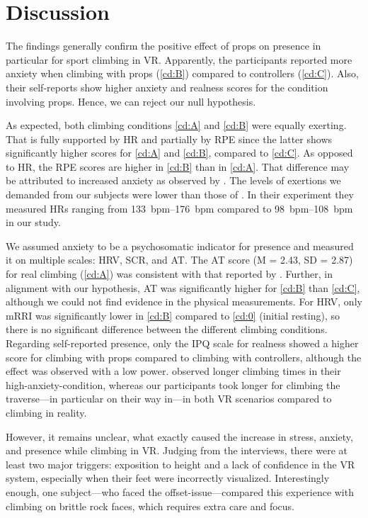 \section{Discussion}
\label{sec:discussion}

The findings generally confirm the positive effect of props on presence \autocite{Meehan2001} in particular for sport climbing in \gls{VR}. Apparently, the participants reported more anxiety when climbing with props (\ref{cd:B}) compared to controllers (\ref{cd:C}). Also, their self-reports show higher anxiety and realness scores for the condition involving props. Hence, we can reject our null hypothesis.

As expected, both climbing conditions \ref{cd:A} and \ref{cd:B} were equally exerting. That is fully supported by \gls{HR} and partially by \gls{RPE} since the latter shows significantly higher scores for \ref{cd:A} and \ref{cd:B}, compared to \ref{cd:C}. As opposed to \gls{HR}, the \gls{RPE} scores are higher in \ref{cd:B} than in \ref{cd:A}. That difference may be attributed to increased anxiety as observed by \textcite{Hardy2007}. The levels of exertions we demanded from our subjects were lower than those of \textcite{Pijpers2003}. In their experiment they measured \glspl{HR} ranging from \SIrange{133}{176}{bpm} compared to \SIrange{98}{108}{bpm} in our study. 

We assumed anxiety to be a psychosomatic indicator for presence and measured it on multiple scales: \gls{HRV}, \gls{SCR}, and \gls{AT}. The \gls{AT} score (M = 2.43, SD = 2.87) for real climbing (\ref{cd:A}) was consistent with that reported by \textcite[M = 2.7, SD = 1.9]{Pijpers2005}. Further, in alignment with our hypothesis, \gls{AT} was significantly higher for \ref{cd:B} than \ref{cd:C}, although we could not find evidence in the physical measurements. For \gls{HRV}, only \gls{mRRI} was significantly lower in \ref{cd:B} compared to \ref{cd:0} (initial resting), so there is no significant difference between the different climbing conditions. Regarding self-reported presence, only the \gls{IPQ} scale for realness showed a higher score for climbing with props compared to climbing with controllers, although the effect was observed with a low power. \textcite{Pijpers2005} observed longer climbing times in their high-anxiety-condition, whereas our participants took longer for climbing the traverse---in particular on their way in---in both \gls{VR} scenarios compared to climbing in reality.

However, it remains unclear, what exactly caused the increase in stress, anxiety, and presence while climbing in \gls{VR}. Judging from the interviews, there were at least two major triggers: exposition to height and a lack of confidence in the \gls{VR} system, especially when their feet were incorrectly visualized. Interestingly enough, one subject---who faced the offset-issue---compared this experience with climbing on brittle rock faces, which requires extra care and focus.


